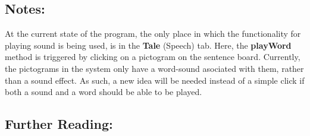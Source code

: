 \subsection{Notes:}
At the current state of the program, the only place in which the functionality for playing sound is being used, is in the \textbf{Tale} (Speech) tab. Here, the \textbf{playWord} method is triggered by clicking on a pictogram on the sentence board.\newline
Currently, the pictograms in the system only have a word-sound asociated with them, rather than a sound effect. As such, a new idea will be needed instead of a simple click if both a sound and a word should be able to be played.

\subsection{Further Reading:}